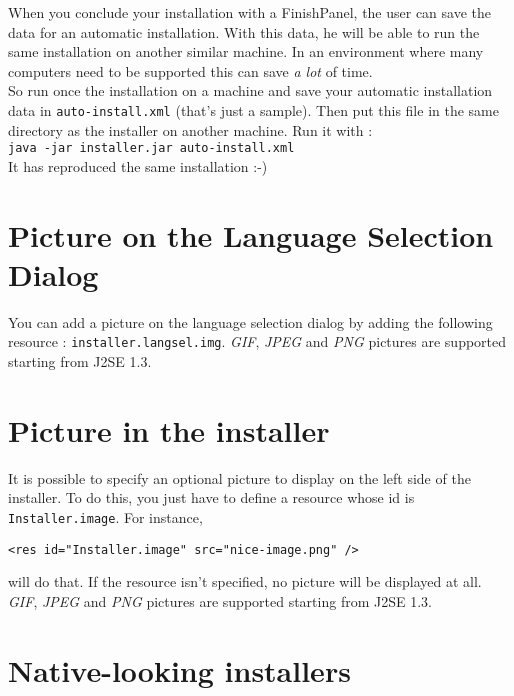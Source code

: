 When you conclude your installation with a FinishPanel, the user can
save the data for an automatic installation. With this data, he will be
able to run the same installation on another similar machine. In an
environment where many computers need to be supported this can save
\textsl{a lot} of time.\\

So run once the installation on a machine and save your automatic installation
data in \texttt{auto-install.xml} (that's just a sample). Then put this file in
the same directory as the installer on another machine. Run it with :\\
\texttt{java -jar installer.jar auto-install.xml}\\

It has reproduced the same installation :-)\\

\section{Picture on the Language Selection Dialog}

You can add a picture on the language selection dialog by adding the following
resource : \texttt{installer.langsel.img}. \textsl{GIF}, \textsl{JPEG} and
\textsl{PNG} pictures are supported starting from J2SE 1.3.\\

\section{Picture in the installer}

It is possible to specify an optional picture to display on the left side of the
installer. To do this, you just have to define a resource whose id is
\texttt{Installer.image}. For instance,
\begin{verbatim}
<res id="Installer.image" src="nice-image.png" />
\end{verbatim}
will do that. If the resource isn't specified, no picture will be displayed at
all. \textsl{GIF}, \textsl{JPEG} and
\textsl{PNG} pictures are supported starting from J2SE 1.3.\\

\section{Native-looking installers}

